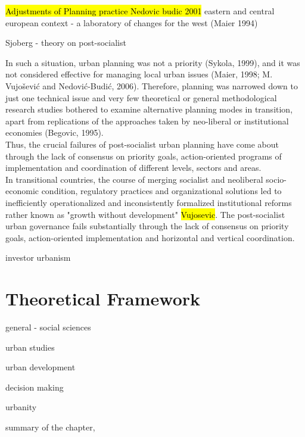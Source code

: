 \documentclass[11pt]{report}
\begin{document}
\hl{Adjustments of Planning practice Nedovic budic 2001}
eastern and central european context - a laboratory of changes for the west (Maier 1994)

Sjoberg - theory on post-socialist

In such a situation, urban planning was not a priority (Sykola, 1999), and it was not considered effective for managing local urban issues (Maier, 1998; M. Vujošević and Nedović-Budić, 2006). Therefore, planning was narrowed down to just one technical issue and very few theoretical or general methodological research studies bothered to examine alternative planning modes in transition, apart from replications of the approaches taken by neo-liberal or institutional economies (Begovic, 1995).
\\
Thus, the crucial failures of post-socialist urban planning have come about through the lack of consensus on priority goals, action-oriented programs of implementation and coordination of different levels, sectors and areas. 
\\
In transitional countries, the course of merging socialist and neoliberal socio-economic condition, regulatory practices and organizational solutions led to inefficiently operationalized and inconsistently formalized institutional reforms rather known as "growth without development" \hl{Vujosevic}.
The post-socialist urban governance fails substantially through the lack of consensus on priority goals, action-oriented implementation and horizontal and vertical coordination.
\\

investor urbanism

\section{Theoretical Framework}

general - social sciences

urban studies

urban development

decision making

urbanity

summary of the chapter,
\end{document}
